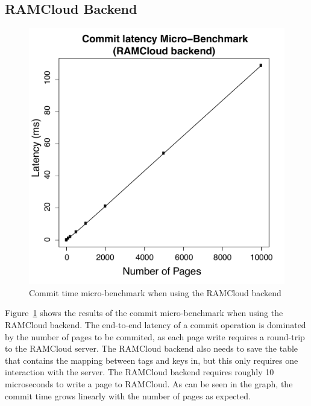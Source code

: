 \subsection{RAMCloud Backend}
\begin{figure}[t!]
\begin{center}
\includegraphics[scale=0.40]{graphs/commit_time_rc_latencies.pdf}
\end{center}
\caption{Commit time micro-benchmark when using the RAMCloud backend}
\label{fig:inmem_fs_design}
\end{figure}

Figure~\ref{fig:inmem_fs_design} shows the results of the commit micro-benchmark when using the RAMCloud backend. 
The end-to-end latency of a commit operation is dominated by the number of pages to be commited, as each page write requires a round-trip to the RAMCloud server.
The RAMCloud backend also needs to save the table that contains the mapping between tags and keys in, but this only requires one interaction with the server.
The RAMCloud backend requires roughly 10 microseconds to write a page to RAMCloud. As can be seen in the graph, the commit time grows linearly with the number of pages as expected.





